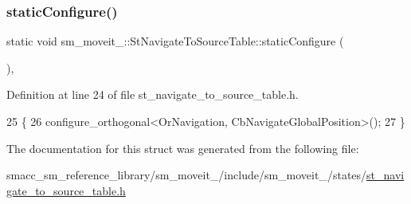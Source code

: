 \subsubsection{\texorpdfstring{static\+Configure()}{staticConfigure()}}
{\footnotesize\ttfamily static void sm\+\_\+moveit\+\_\+::\+St\+Navigate\+To\+Source\+Table\+::static\+Configure (\begin{DoxyParamCaption}{ }\end{DoxyParamCaption})\hspace{0.3cm}{\ttfamily [inline]}, {\ttfamily [static]}}



Definition at line 24 of file st\+\_\+navigate\+\_\+to\+\_\+source\+\_\+table.\+h.


\begin{DoxyCode}
25         \{
26             configure\_orthogonal<OrNavigation, CbNavigateGlobalPosition>();
27         \}
\end{DoxyCode}


The documentation for this struct was generated from the following file\+:\begin{DoxyCompactItemize}
\item 
smacc\+\_\+sm\+\_\+reference\+\_\+library/sm\+\_\+moveit\+\_/include/sm\+\_\+moveit\+\_/states/\hyperlink{st__navigate__to__source__table_8h}{st\+\_\+navigate\+\_\+to\+\_\+source\+\_\+table.\+h}\end{DoxyCompactItemize}
